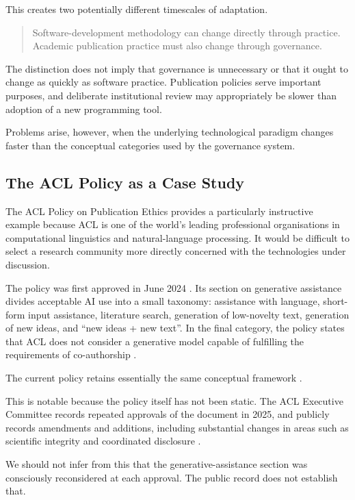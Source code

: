 This creates two potentially different timescales of adaptation.

\begin{quote}
Software-development methodology can change directly through practice. Academic publication practice must also change through governance.
\end{quote}

The distinction does not imply that governance is unnecessary or that it ought to change as quickly as software practice. Publication policies serve important purposes, and deliberate institutional review may appropriately be slower than adoption of a new programming tool.

Problems arise, however, when the underlying technological paradigm changes faster than the conceptual categories used by the governance system.


\subsection{The ACL Policy as a Case Study}

The ACL Policy on Publication Ethics provides a particularly instructive example because ACL is one of the world's leading professional organisations in computational linguistics and natural-language processing. It would be difficult to select a research community more directly concerned with the technologies under discussion.

The policy was first approved in June 2024 \citep{acl2024policy}. Its section on generative assistance divides acceptable AI use into a small taxonomy: assistance with language, short-form input assistance, literature search, generation of low-novelty text, generation of new ideas, and ``new ideas + new text''. In the final category, the policy states that ACL does not consider a generative model capable of fulfilling the requirements of co-authorship \citep{acl2024policy}.

The current policy retains essentially the same conceptual framework \citep{acl2026policy}.

This is notable because the policy itself has not been static. The ACL Executive Committee records repeated approvals of the document in 2025, and publicly records amendments and additions, including substantial changes in areas such as scientific integrity and coordinated disclosure \citep{acl2026policy,aclresolutions2025}.

We should not infer from this that the generative-assistance section was consciously reconsidered at each approval. The public record does not establish that.

